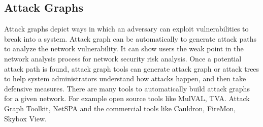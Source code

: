 \documentclass[pdftex,english,oribibl]{llncs}
\begin{document}
\subsection{Attack Graphs}  
Attack graphs depict ways in which an adversary can exploit vulnerabilities to break into a system. Attack graph can be automatically to generate attack paths to analyze the network vulnerability. It can show users the weak point in the network analysis process for network security risk analysis. Once a potential attack path is found, attack graph tools can generate attack graph or attack trees to help system administrators understand how attacks happen, and then take defensive measures. There are many tools to automatically build attack graphs for a given network. For example open source tools like MulVAL, TVA. Attack Graph Toolkit, NetSPA and the commercial tools like Cauldron, FireMon, Skybox View.
\end{document}
